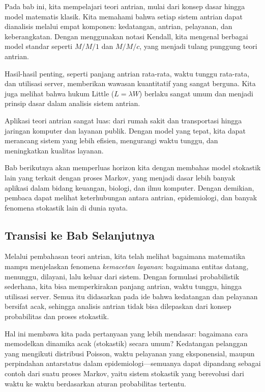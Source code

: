 \documentclass{bukumjh}
\begin{document}
Pada bab ini, kita mempelajari {\jsg teori antrian}, mulai dari konsep dasar hingga model matematis klasik. Kita memahami bahwa setiap sistem antrian dapat dianalisis melalui empat komponen: kedatangan, antrian, pelayanan, dan keberangkatan. Dengan menggunakan notasi Kendall, kita mengenal berbagai model standar seperti $M/M/1$ dan $M/M/c$, yang menjadi tulang punggung teori antrian.

Hasil-hasil penting, seperti panjang antrian rata-rata, waktu tunggu rata-rata, dan utilisasi server, memberikan wawasan kuantitatif yang sangat berguna. Kita juga melihat bahwa hukum Little ($L = \lambda W$) berlaku sangat umum dan menjadi prinsip dasar dalam analisis sistem antrian.

Aplikasi teori antrian sangat luas: dari rumah sakit dan transportasi hingga jaringan komputer dan layanan publik. Dengan model yang tepat, kita dapat merancang sistem yang lebih efisien, mengurangi waktu tunggu, dan meningkatkan kualitas layanan.

Bab berikutnya akan memperluas horizon kita dengan membahas {\jsg model stokastik lain yang terkait dengan proses Markov}, yang menjadi dasar lebih banyak aplikasi dalam bidang keuangan, biologi, dan ilmu komputer. Dengan demikian, pembaca dapat melihat keterhubungan antara antrian, epidemiologi, dan banyak fenomena stokastik lain di dunia nyata.

\subsection*{Transisi ke Bab Selanjutnya}

Melalui pembahasan teori antrian, kita telah melihat bagaimana matematika mampu menjelaskan fenomena \textit{kemacetan layanan}: bagaimana entitas datang, menunggu, dilayani, lalu keluar dari sistem. Dengan formulasi probabilistik sederhana, kita bisa memperkirakan panjang antrian, waktu tunggu, hingga utilisasi server. Semua itu didasarkan pada ide bahwa kedatangan dan pelayanan bersifat acak, sehingga analisis antrian tidak bisa dilepaskan dari konsep probabilitas dan proses stokastik.

Hal ini membawa kita pada pertanyaan yang lebih mendasar: {\jsg bagaimana cara memodelkan dinamika acak (stokastik) secara umum?} Kedatangan pelanggan yang mengikuti distribusi Poisson, waktu pelayanan yang eksponensial, maupun perpindahan antarstatus dalam epidemiologi—semuanya dapat dipandang sebagai contoh dari suatu {\jsg proses Markov}, yaitu sistem stokastik yang berevolusi dari waktu ke waktu berdasarkan aturan probabilitas tertentu.
\end{document}
